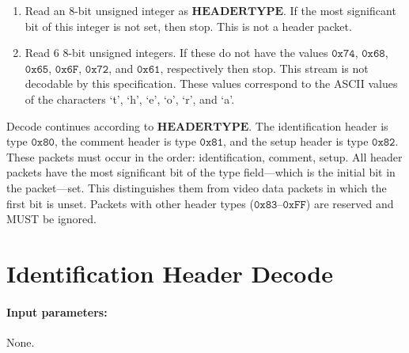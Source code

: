 \documentclass[11pt,letterpaper]{book}
\newcommand{\bitvar}[1]{\ensuremath{\mathbf{\bm #1}}}
\newcommand{\hex}[1]{\ensuremath{\mathtt{0x#1}}}
\numberwithin{equation}{chapter}
\numberwithin{figure}{chapter}
\numberwithin{table}{chapter}
\begin{document}
\begin{enumerate}
\item
Read an 8-bit unsigned integer as \bitvar{HEADERTYPE}.
If the most significant bit of this integer is not set, then stop.
This is not a header packet.
\item
Read 6 8-bit unsigned integers.
If these do not have the values \hex{74}, \hex{68}, \hex{65}, \hex{6F},
 \hex{72}, and \hex{61}, respectively then stop.
This stream is not decodable by this specification.
These values correspond to the ASCII values of the characters `t', `h', `e',
 `o', `r', and `a'.
\end{enumerate}

Decode continues according to \bitvar{HEADERTYPE}.
The identification header is type \hex{80}, the comment header is type
 \hex{81}, and the setup header is type \hex{82}.
These packets must occur in the order: identification, comment, setup.
All header packets have the most significant bit of the type
 field---which is the initial bit in the packet---set.
This distinguishes them from video data packets in which the first bit
 is unset.
Packets with other header types (\hex{83}--\hex{FF}) are reserved and MUST be
 ignored.

\section{Identification Header Decode}
\label{sec:idheader}

\paragraph{Input parameters:} None.
\end{document}
